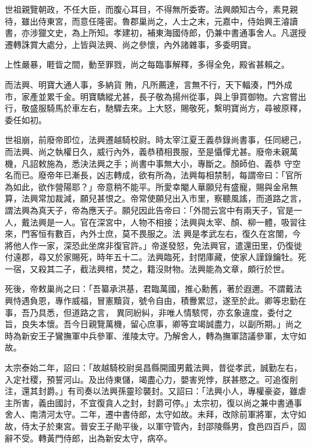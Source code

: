 \begin{pinyinscope}
 世祖親覽朝政，不任大臣，而腹心耳目，不得無所委寄。法興頗知古今，素見親待，雖出侍東宮，而意任隆密。魯郡巢尚之，人士之末，元嘉中，侍始興王濬讀書，亦涉獵文史，為上所知。孝建初，補東海國侍郎，仍兼中書通事舍人。凡選授遷轉誅賞大處分，上皆與法興、尚之參懷，內外諸雜事，多委明寶。



 上性嚴暴，睚眥之間，動至罪戮，尚之每臨事解釋，多得全免，殿省甚賴之。



 而法興、明寶大通人事，多納貨
 賄，凡所薦達，言無不行，天下輻湊，門外成市，家產並累千金。明寶驕縱尤甚，長子敬為揚州從事，與上爭買御物。六宮嘗出行，敬盛服騎馬於車左右，馳驟去來。上大怒，賜敬死，繫明寶尚方，尋被原釋，委任如初。



 世祖崩，前廢帝即位，法興遷越騎校尉。時太宰江夏王義恭錄尚書事，任同總己，而法興、尚之執權日久，威行內外，義恭積相畏服，至是懾憚尤甚。廢帝未親萬機，凡詔敕施為，悉決法興之手；尚書中事無大小，專斷之。顏師伯、義恭
 守空名而已。廢帝年已漸長，凶志轉成，欲有所為，法興每相禁制，每謂帝曰：「官所為如此，欲作營陽耶？」帝意稍不能平。所愛幸閹人華願兒有盛寵，賜與金帛無算，法興常加裁減，願兒甚恨之。帝常使願兒出入市里，察聽風謠，而道路之言，謂法興為真天子，帝為應天子。願兒因此告帝曰：「外間云宮中有兩天子，官是一人，戴法興是一人。官在深宮中，人物不相接；法興與太宰、顏、柳一體，吸習往來，門客恒有數百，內外士庶，莫不畏服之。法
 興是孝武左右，復久在宮闈，今將他人作一家，深恐此坐席非復官許。」帝遂發怒，免法興官，遣還田里，仍復徙付遠郡，尋又於家賜死，時年五十二。法興臨死，封閉庫藏，使家人謹錄鑰牡。死一宿，又殺其二子，截法興棺，焚之，籍沒財物。法興能為文章，頗行於世。



 死後，帝敕巢尚之曰：「吾纂承洪基，君臨萬國，推心勳舊，著於遐邇。不謂戴法興恃遇負恩，專作威福，冒憲黷貨，號令自由，積釁累愆，遂至於此。卿等忠勤在事，吾乃具悉，但道路之言，
 異同紛糾，非唯人情駭愕，亦玄象違度，委付之旨，良失本懷。吾今日親覽萬機，留心庶事，卿等宜竭誠盡力，以副所期。」尚之時為新安王子鸞撫軍中兵參軍、淮陵太守。乃解舍人，轉為撫軍諮議參軍，太守如故。



 太宗泰始二年，詔曰：「故越騎校尉吳昌縣開國男戴法興，昔從孝武，誠勤左右，入定社稷，預誓河山。及出侍東儲，竭盡心力，嬰害兇悖，朕甚愍之。可追復削注，還其封爵。」有司奏以法興孫靈珍襲封。又詔曰：「法興小人，專權豪姿，雖虐
 主所害，義由國討，不宜復貪人之封，封爵可停。」太宗初，復以尚之兼中書通事舍人、南清河太守。二年，遷中書侍郎，太守如故。未拜，改除前軍將軍，太守如故，侍太子於東宮。晉安王子勛平後，以軍守管內，封邵陵縣男，食邑四百戶，固辭不受。轉黃門侍郎，出為新安太守，病卒。




\end{pinyinscope}
